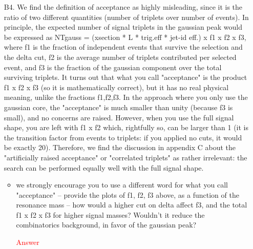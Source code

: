 \documentclass[paper=a4, fontsize=11pt]{scrartcl}
\begin{document}
\begin{itemize}
\item[B4.] We find the definition of acceptance as highly misleading, since it is the ratio of two different quantities (number of triplets over number of events). In principle, the expected number of signal triplets in the gaussian peak would be expressed as NTgauss = (xsection * L * trig.eff * jet-id eff.) x f1 x f2 x f3, where f1 is the fraction of independent events that survive the selection and the delta cut, f2 is the average number of triplets contributed per selected event, and f3 is the fraction of the gaussian component over the total surviving triplets. It turns out that what you call "acceptance" is the product f1 x f2 x f3 (so it is mathematically correct), but it has no real physical meaning, unlike the fractions f1,f2,f3. In the approach where you only use the gaussian core, the "acceptance" is much smaller than unity (because f3 is small), and no
concerns are raised. However, when you use the full signal shape, you are left with f1 x f2 which, rightfully so, can be larger than 1 (it is the transition factor from events to triplets: if you applied no cuts, it would be exactly 20). Therefore, we find the discussion in appendix C about the "artificially raised acceptance" or "correlated triplets" as rather irrelevant: the search can be performed equally well with the full signal shape.
\begin{itemize}
\item we strongly encourage you to use a different word for what you call "acceptance" -- provide the plots of f1, f2, f3 above, as a function of the resonance mass -- how would a higher cut on delta affect f3, and the total f1 x f2 x f3 for higher signal masses? Wouldn't it reduce the combinatorics background, in favor of the gaussian peak?

\textcolor{red}{Answer}\\
\end{itemize}


\end{itemize}
\end{document}
